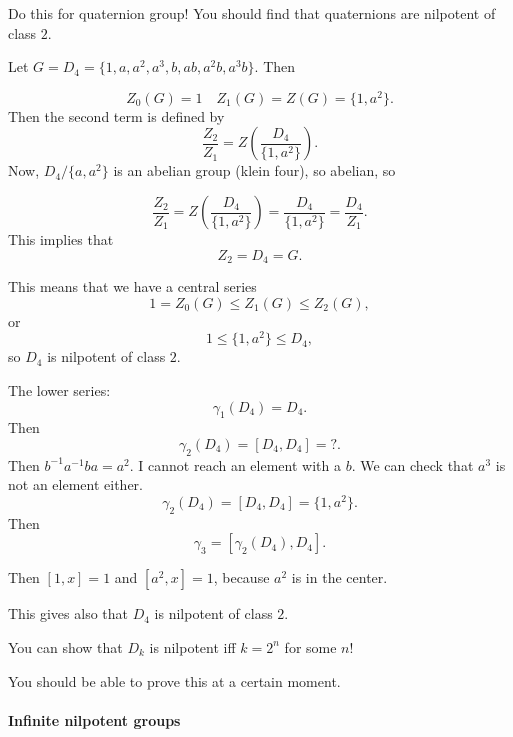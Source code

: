 \begin{remark}[Exam]
    Do this for quaternion group!
    You should find that quaternions are nilpotent of class $2$.
\end{remark}

Let $G = D_4 = \{1, a, a^2, a^3, b, ab, a^2b, a^3b\} $.
Then

\[
    Z_0(G) = 1 \quad Z_1(G) = Z(G) = \{1, a^2\} 
.\] 
Then the second term is defined by
\[
    \frac{Z_2}{Z_1} = Z \left(\frac{D_4}{\{1, a^2\} }\right)
.\] 
Now, $ D_4 / \{a, a^2\} $ is an abelian group (klein four), so abelian, so 

\[
    \frac{Z_2}{Z_1} = Z \left(\frac{D_4}{\{1, a^2\} }\right) = \frac{D_4}{\{1, a^2\} } = \frac{D_4}{Z_1}
.\] 
This implies that
\[
Z_2 = D_4 = G
.\] 

This means that we have a central series
\[
    1 =  Z_0(G) \le  Z_1(G) \le Z_2(G)
,\] 
or
\[
    1  \le  \{1, a^2\}  \le D_4
,\] 
so $ D_4$ is nilpotent of class $2$.

The lower series:
\[
    \gamma_1(D_4) = D_4
.\] 
Then
\[
    \gamma_2(D_4) = [D_4, D_4] = ?
.\]
Then $b^{-1} a^{-1} ba = a^2$.
I cannot reach an element with a $b$.
We can check that $a^3$ is not an element either.
\[
    \gamma_2(D_4) = [D_4, D_4] = \{1, a^2\} 
.\]
Then 
\[
    \gamma_3 = [\gamma_2(D_4), D_4]
.\] 

Then $[1, x] = 1$ and  $[a^2, x] = 1$, because $a^2$ is in the center.

This gives also that $ D_4$ is nilpotent of class $2$.


 \begin{remark}
    You can show that $D_{k}$ is nilpotent iff $k = 2^{n}$ for some $n$!
\end{remark}
You should be able to prove this at a certain moment.



\paragraph{Infinite nilpotent groups}

